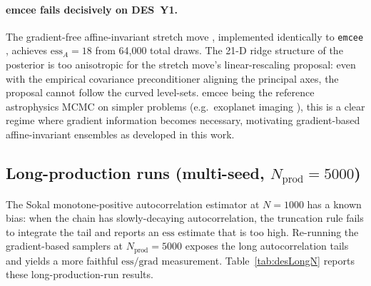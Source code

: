 \documentclass{article}
\begin{document}
\paragraph{emcee fails decisively on DES~Y1.} The gradient-free
affine-invariant stretch move \cite{goodman2010ensemble}, implemented
identically to \texttt{emcee} \cite{foreman2013emcee}, achieves
$\mathrm{ess}_A=18$ from 64{,}000 total draws. The 21-D ridge structure
of the posterior is too anisotropic for the stretch move's
linear-rescaling proposal: even with the empirical covariance
preconditioner aligning the principal axes, the proposal cannot follow
the curved level-sets. emcee being the reference astrophysics MCMC
\cite{foreman2013emcee} on simpler problems (e.g.~exoplanet imaging
\cite{zieba2023no}), this is a clear regime where gradient information
becomes necessary, motivating gradient-based affine-invariant ensembles
as developed in this work.

\subsection{Long-production runs (multi-seed, $N_{\text{prod}}=5000$)}\label{ssec:desLongN}

The Sokal monotone-positive autocorrelation estimator at $N=1000$ has a
known bias: when the chain has slowly-decaying autocorrelation, the
truncation rule fails to integrate the tail and reports an
$\mathrm{ess}$ estimate that is too high. Re-running the gradient-based
samplers at $N_{\text{prod}}=5000$ exposes the long autocorrelation
tails and yields a more faithful $\mathrm{ess}/\text{grad}$ measurement.
Table~\ref{tab:desLongN} reports these long-production-run results.
\end{document}
